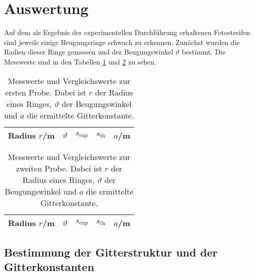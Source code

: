 

\section{Auswertung}
Auf dem als Ergebnis der experimentellen Durchführung erhaltenen Fotostreifen sind
jeweils einige Beugungsringe schwach zu erkennen. Zunächst wurden die Radien dieser
Ringe gemessen und der Beugungswinkel $\vartheta$ bestimmt. Die Messwerte sind in den
Tabellen \ref{tab:1} und \ref{tab:2} zu sehen.

\begin{table}[h]
\centering
\begin{tabular}{ccccc}
\midrule
\midrule
Radius $r$/m & $\vartheta$ &$s_\text{exp}$& $s_\text{th}$& $a$/m \\
\midrule

\midrule
\midrule
\end{tabular}
\caption{Messwerte und Vergleichswerte zur ersten Probe. Dabei ist $r$ der Radius
eines Ringes, $\vartheta$ der Beugungswinkel und $a$ die ermittelte Gitterkonstante.}
\label{tab:1}
\end{table}
\begin{table}[h]
\centering
\begin{tabular}{ccccc}
\midrule
\midrule
Radius $r$/m & $\vartheta$ &$s_\text{exp}$& $s_\text{th}$& $a$/m \\
\midrule

\midrule
\midrule
\end{tabular}
\caption{Messwerte und Vergleichswerte zur zweiten Probe. Dabei ist $r$ der Radius
eines Ringes, $\vartheta$ der Beugungswinkel und $a$ die ermittelte Gitterkonstante.}
\label{tab:2}
\end{table}

\subsection{Bestimmung der Gitterstruktur und der Gitterkonstanten}

